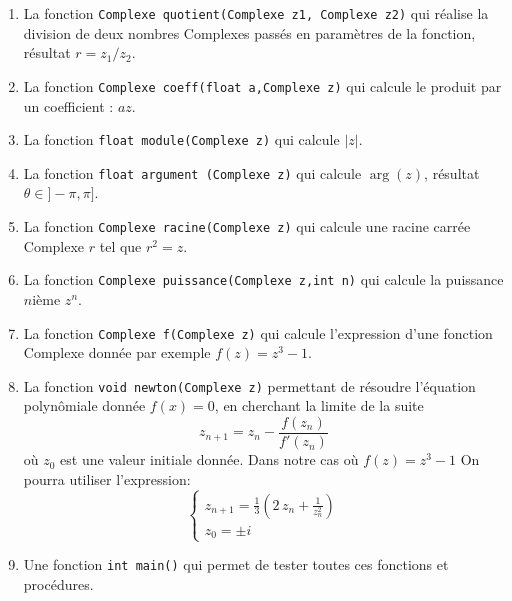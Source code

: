 \documentclass[a4paper]{article}
\begin{document}
\begin{enumerate}
\item  La fonction {\tt  Complexe quotient(Complexe z1, Complexe z2)} qui réalise la division de deux nombres Complexes passés en paramètres de la fonction, résultat $r=z_1/z_2$.
\item  La fonction {\tt  Complexe coeff(float a,Complexe z)} qui calcule le produit par un coefficient : $a z$.
\item  La fonction {\tt  float module(Complexe z)} qui calcule $|z|$.

\item  La fonction {\tt  float argument (Complexe z)} qui calcule $\arg(z)$, résultat $\theta \in ]-\pi, \pi]$.

\item  La fonction {\tt  Complexe racine(Complexe z)} qui calcule une racine carrée Complexe  $r$ tel que  $r^2=z$.
\item  La fonction {\tt  Complexe puissance(Complexe z,int n)} qui calcule  la puissance $n$ième $z^n$.
\item  La fonction {\tt  Complexe f(Complexe z)} qui calcule l'expression d'une fonction Complexe donnée par exemple $f(z)=z^3-1$.
\item La fonction {\tt  void newton(Complexe z)} permettant de résoudre l'équation polynômiale donnée $f(x)=0$, en cherchant la limite de la suite 
\[z_{n+1}=z_n-\frac{f(z_n)}{f'(z_n)}\]
où $z_0$ est une valeur initiale donnée. Dans notre cas où $f(z)=z^3-1$ On pourra utiliser l'expression:
\[\left\{\begin{array}{l}
z_{n+1}=\displaystyle\frac 13\left(2\,z_n+ \frac{1}{z_n^2}\right)\\
z_0=\pm i 
\end{array}\right.
\]


\item  Une fonction {\tt  int main()}  qui permet de tester toutes ces fonctions et procédures.

\end{enumerate}
\end{document}
